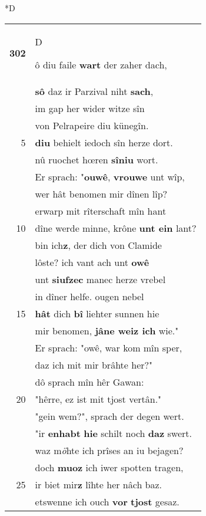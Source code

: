 \documentclass[8pt,a4paper,notitlepage]{article}
\begin{document}
\begin{table}[ht]
\begin{minipage}[t]{0.5\linewidth}
\small
\begin{center}*D
\end{center}
\begin{tabular}{rl}
\textbf{302} & \begin{large}D\end{large}ô diu faile \textbf{wart} der zaher dach,\\ 
 & \textbf{sô} daz ir Parzival niht \textbf{sach},\\ 
 & im gap her wider witze sîn\\ 
 & von Pelrapeire diu künegîn.\\ 
5 & \textbf{diu} behielt iedoch sîn herze dort.\\ 
 & nû ruochet hœren \textbf{sîniu} wort.\\ 
 & Er sprach: "\textbf{ouwê}, \textbf{vrouwe} unt wîp,\\ 
 & wer hât benomen mir dînen lîp?\\ 
 & erwarp mit rîterschaft mîn hant\\ 
10 & dîne werde minne, krône \textbf{unt ein} lant?\\ 
 & bin ich\textbf{z}, der dich von Clamide\\ 
 & lôste? ich vant ach unt \textbf{owê}\\ 
 & unt \textbf{siufzec} manec herze vrebel\\ 
 & in dîner helfe. ougen nebel\\ 
15 & \textbf{hât} dich \textbf{bî} liehter sunnen hie\\ 
 & mir benomen, \textbf{jâne weiz ich} wie."\\ 
 & Er sprach: "owê, war kom mîn sper,\\ 
 & daz ich mit mir brâhte her?"\\ 
 & dô sprach mîn hêr Gawan:\\ 
20 & "hêrre, ez ist mit tjost vertân."\\ 
 & "gein wem?", sprach der degen wert.\\ 
 & "ir \textbf{en}\textbf{habt} \textbf{hie} schilt noch \textbf{daz} swert.\\ 
 & waz m\textit{ö}hte ich prîses an iu bejagen?\\ 
 & doch \textbf{muoz} ich iwer spotten tragen,\\ 
25 & ir biet mir\textbf{z} lîhte her nâch baz.\\ 
 & etswenne ich ouch \textbf{vor} \textbf{tjost} gesaz.\\ 

\end{tabular}
\end{minipage}
\end{table}
\end{document}
